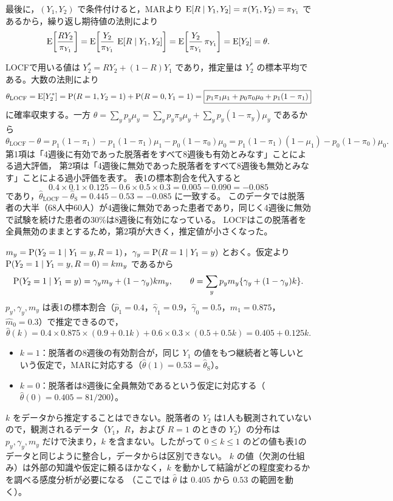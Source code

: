 \documentclass[a4paper,11pt]{ltjsarticle}
\begin{document}
最後に，$(Y_1,Y_2)$ で条件付けると，MARより $\operatorname{E}[R\mid Y_1,Y_2]=\pi(Y_1,Y_2)=\pi_{Y_1}$ であるから，繰り返し期待値の法則により
\[
\operatorname{E}\!\left[\frac{RY_2}{\pi_{Y_1}}\right]=\operatorname{E}\!\left[\frac{Y_2}{\pi_{Y_1}}\,\operatorname{E}[R\mid Y_1,Y_2]\right]=\operatorname{E}\!\left[\frac{Y_2}{\pi_{Y_1}}\,\pi_{Y_1}\right]=\operatorname{E}[Y_2]=\theta .
\]

LOCFで用いる値は $Y_2^{*}=RY_2+(1-R)Y_1$ であり，推定量は $Y_2^*$ の標本平均である。大数の法則により
\[
\theta_{\mathrm{LOCF}}=\operatorname{E}[Y_2^*]=\operatorname{P}(R=1,Y_2=1)+\operatorname{P}(R=0,Y_1=1)=\boxed{p_1\pi_1\mu_1+p_0\pi_0\mu_0+p_1(1-\pi_1)}
\]
に確率収束する。一方 $\theta=\sum_yp_y\mu_y=\sum_yp_y\pi_y\mu_y+\sum_yp_y(1-\pi_y)\mu_y$ であるから
\[
\theta_{\mathrm{LOCF}}-\theta=p_1(1-\pi_1)-p_1(1-\pi_1)\mu_1-p_0(1-\pi_0)\mu_0
=\boxed{p_1(1-\pi_1)(1-\mu_1)-p_0(1-\pi_0)\mu_0}.
\]
第1項は「4週後に有効であった脱落者をすべて8週後も有効とみなす」ことによる過大評価，
第2項は「4週後に無効であった脱落者をすべて8週後も無効とみなす」ことによる過小評価を表す。
表1の標本割合を代入すると
\[
0.4\times0.1\times0.125-0.6\times0.5\times0.3=0.005-0.090=-0.085
\]
であり，$\hat\theta_{\mathrm{LOCF}}-\hat\theta_{\mathrm S}=0.445-0.53=-0.085$ に一致する。
このデータでは脱落者の大半（68人中60人）が4週後に無効であった患者であり，同じく4週後に無効で試験を続けた患者の30\%は8週後に有効になっている。
LOCFはこの脱落者を全員無効のままとするため，第2項が大きく，推定値が小さくなった。

$m_y=\operatorname{P}(Y_2=1\mid Y_1=y,R=1)$，$\gamma_y=\operatorname{P}(R=1\mid Y_1=y)$ とおく。仮定より $\operatorname{P}(Y_2=1\mid Y_1=y,R=0)=km_y$ であるから
\[
\operatorname{P}(Y_2=1\mid Y_1=y)=\gamma_ym_y+(1-\gamma_y)km_y,\qquad
\theta=\sum_yp_ym_y\{\gamma_y+(1-\gamma_y)k\}.
\]
$p_y,\gamma_y,m_y$ は表1の標本割合（$\hat p_1=0.4$，$\hat\gamma_1=0.9$，$\hat\gamma_0=0.5$，$\hat m_1=0.875$，$\hat m_0=0.3$）で推定できるので，
\[
\hat\theta(k)=0.4\times0.875\times(0.9+0.1k)+0.6\times0.3\times(0.5+0.5k)=\boxed{0.405+0.125k}.
\]
\begin{itemize}
\item $k=1$：脱落者の8週後の有効割合が，同じ $Y_1$ の値をもつ継続者と等しいという仮定で，MARに対応する（$\hat\theta(1)=0.53=\hat\theta_{\mathrm S}$）。
\item $k=0$：脱落者は8週後に全員無効であるという仮定に対応する（$\hat\theta(0)=0.405=81/200$）。
\end{itemize}
$k$ をデータから推定することはできない。脱落者の $Y_2$ は1人も観測されていないので，観測されるデータ（$Y_1$，$R$，および $R=1$ のときの $Y_2$）の分布は
$p_y,\gamma_y,m_y$ だけで決まり，$k$ を含まない。したがって $0\le k\le1$ のどの値も表1のデータと同じように整合し，データからは区別できない。
$k$ の値（欠測の仕組み）は外部の知識や仮定に頼るほかなく，$k$ を動かして結論がどの程度変わるかを調べる感度分析が必要になる
（ここでは $\hat\theta$ は $0.405$ から $0.53$ の範囲を動く）。
\newpage
\end{document}
